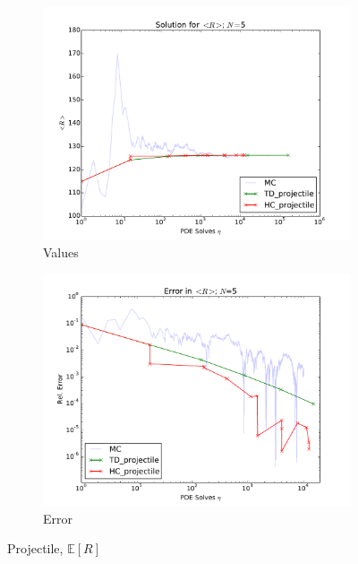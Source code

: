 \documentclass{mc2015}
\newcommand{\expv}[1]{\ensuremath{\mathbb{E}[ #1]}}
\begin{document}
\begin{figure}[htb]
\centering
  \begin{subfigure}[b]{0.49 \textwidth}
   \includegraphics[width=\textwidth]{../graphics/projectile_solns}
   \caption{Values}
   \label{prj vals}
  \end{subfigure}
  \begin{subfigure}[b]{0.49 \textwidth}
   \includegraphics[width=\textwidth]{../graphics/projectile_errs}
   \caption{Error}
   \label{atn errs}
  \end{subfigure}
  \caption{Projectile, \expv{R}}
  \label{prj}
\end{figure}
\end{document}
